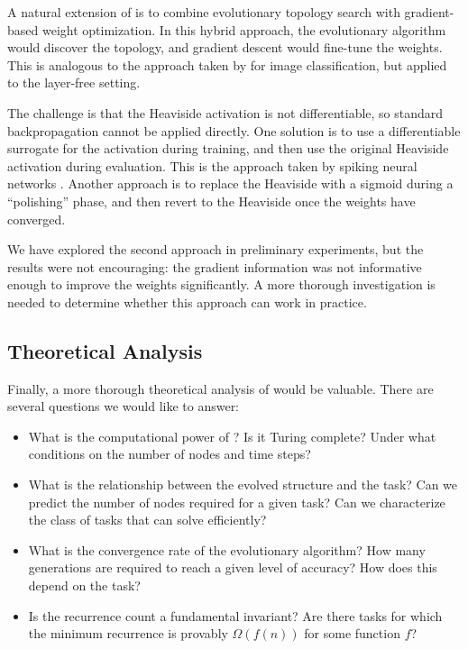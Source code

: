 A natural extension of \modnet{} is to combine evolutionary topology
search with gradient-based weight optimization. In this hybrid
approach, the evolutionary algorithm would discover the topology, and
gradient descent would fine-tune the weights. This is analogous to the
approach taken by \citet{real2019regularized} for image classification,
but applied to the layer-free setting.

The challenge is that the Heaviside activation is not differentiable,
so standard backpropagation cannot be applied directly. One solution is
to use a differentiable surrogate for the activation during training,
and then use the original Heaviside activation during evaluation. This
is the approach taken by spiking neural networks
\citep{neftci2019surrogate}. Another approach is to replace the
Heaviside with a sigmoid during a ``polishing'' phase, and then revert
to the Heaviside once the weights have converged.

We have explored the second approach in preliminary experiments, but
the results were not encouraging: the gradient information was not
informative enough to improve the weights significantly. A more
thorough investigation is needed to determine whether this approach can
work in practice.

\subsection{Theoretical Analysis}
\label{sec:disc-future-theory}

Finally, a more thorough theoretical analysis of \modnet{} would be
valuable. There are several questions we would like to answer:

\begin{itemize}
  \item What is the computational power of \modnet{}? Is it Turing
    complete? Under what conditions on the number of nodes and time
    steps?
  \item What is the relationship between the evolved structure and the
    task? Can we predict the number of nodes required for a given task?
    Can we characterize the class of tasks that \modnet{} can solve
    efficiently?
  \item What is the convergence rate of the evolutionary algorithm?
    How many generations are required to reach a given level of
    accuracy? How does this depend on the task?
  \item Is the recurrence count a fundamental invariant? Are there
    tasks for which the minimum recurrence is provably $\Omega(f(n))$
    for some function $f$?
\end{itemize}

